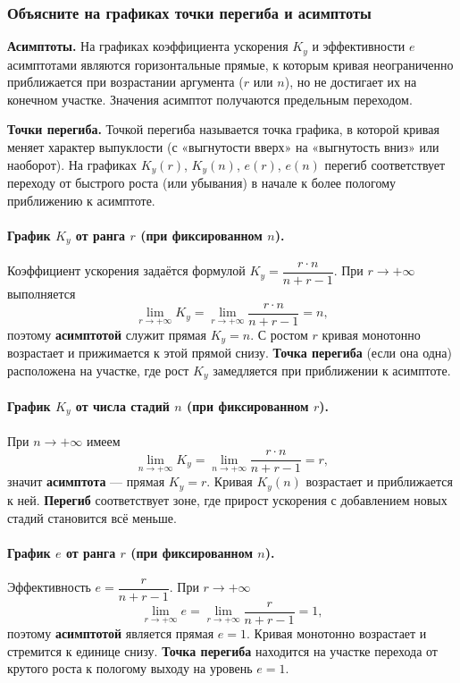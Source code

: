 \subsubsection*{Объясните на графиках точки перегиба и асимптоты}

\textbf{Асимптоты.} На графиках коэффициента ускорения $K_y$ и эффективности $e$ асимптотами являются горизонтальные прямые, к которым кривая неограниченно приближается при возрастании аргумента ($r$ или $n$), но не достигает их на конечном участке. Значения асимптот получаются предельным переходом.

\textbf{Точки перегиба.} Точкой перегиба называется точка графика, в которой кривая меняет характер выпуклости (с «выгнутости вверх» на «выгнутость вниз» или наоборот). На графиках $K_y(r)$, $K_y(n)$, $e(r)$, $e(n)$ перегиб соответствует переходу от быстрого роста (или убывания) в начале к более пологому приближению к асимптоте.

\paragraph{График $K_y$ от ранга $r$ (при фиксированном $n$).}
Коэффициент ускорения задаётся формулой $K_y = \dfrac{r \cdot n}{n + r - 1}$. При $r \to +\infty$ выполняется
\[
\lim_{r \to +\infty} K_y = \lim_{r \to +\infty} \frac{r \cdot n}{n + r - 1} = n,
\]
поэтому \textbf{асимптотой} служит прямая $K_y = n$. С ростом $r$ кривая монотонно возрастает и прижимается к этой прямой снизу. \textbf{Точка перегиба} (если она одна) расположена на участке, где рост $K_y$ замедляется при приближении к асимптоте.

\paragraph{График $K_y$ от числа стадий $n$ (при фиксированном $r$).}
При $n \to +\infty$ имеем
\[
\lim_{n \to +\infty} K_y = \lim_{n \to +\infty} \frac{r \cdot n}{n + r - 1} = r,
\]
значит \textbf{асимптота} --- прямая $K_y = r$. Кривая $K_y(n)$ возрастает и приближается к ней. \textbf{Перегиб} соответствует зоне, где прирост ускорения с добавлением новых стадий становится всё меньше.

\paragraph{График $e$ от ранга $r$ (при фиксированном $n$).}
Эффективность $e = \dfrac{r}{n + r - 1}$. При $r \to +\infty$
\[
\lim_{r \to +\infty} e = \lim_{r \to +\infty} \frac{r}{n + r - 1} = 1,
\]
поэтому \textbf{асимптотой} является прямая $e = 1$. Кривая монотонно возрастает и стремится к единице снизу. \textbf{Точка перегиба} находится на участке перехода от крутого роста к пологому выходу на уровень $e = 1$.

